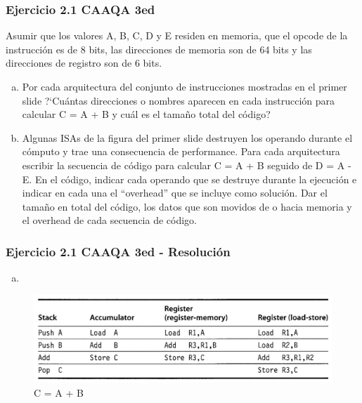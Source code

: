 \documentclass{beamer}
\begin{document}
\begin{frame}
 \frametitle{Ejercicio 2.1 CAAQA 3ed}
 
Asumir que los valores A, B, C, D y E residen en memoria, que el opcode de la instrucción es de 8 bits, las direcciones de memoria son de 64 bits y las direcciones de registro son de 6 bits.

\begin{enumerate}[a.]
 \item Por cada arquitectura del conjunto de instrucciones mostradas en el primer slide ?`Cuántas direcciones o nombres aparecen en cada instrucción para calcular  C = A + B y cuál es el tamaño total del código?

 \item Algunas ISAs de la figura del primer slide destruyen los operando durante el cómputo y trae una consecuencia de performance. Para cada arquitectura escribir la secuencia de código para calcular C = A + B seguido de D = A - E. En el código, indicar cada operando que se destruye durante la ejecución e indicar en cada una el “overhead”  que se incluye como solución. Dar el tamaño en total del código, los datos que son movidos de o hacia memoria y el overhead de cada secuencia de código.
\end{enumerate}
\end{frame}

\begin{frame}
 \frametitle{Ejercicio 2.1 CAAQA 3ed - Resolución}
 \begin{enumerate}[a.]
 \item
\end{enumerate}
\begin{center}
\begin{figure}
 \includegraphics[scale=.45,keepaspectratio=true]{Ejercicio21a.png}
\caption*{C = A + B}
\end{figure}
\end{center}
 \end{frame}
\end{document}
